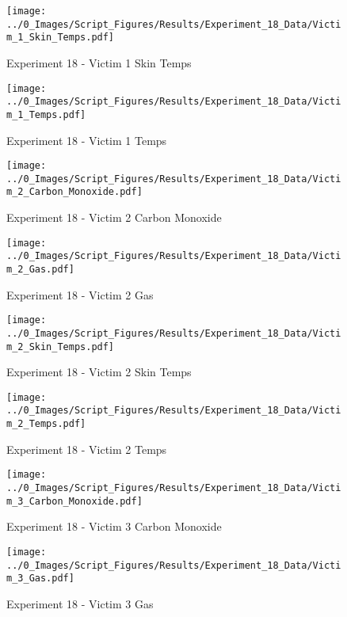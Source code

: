 	\begin{figure}[H]
		\centering
		\texttt{[image: ../0\_Images/Script\_Figures/Results/Experiment\_18\_Data/Victim\_1\_Skin\_Temps.pdf]}
		\caption[]{Experiment 18 - Victim 1 Skin Temps}
	\end{figure}
 
	\clearpage

	\begin{figure}[H]
		\centering
		\texttt{[image: ../0\_Images/Script\_Figures/Results/Experiment\_18\_Data/Victim\_1\_Temps.pdf]}
		\caption[]{Experiment 18 - Victim 1 Temps}
	\end{figure}
 

	\begin{figure}[H]
		\centering
		\texttt{[image: ../0\_Images/Script\_Figures/Results/Experiment\_18\_Data/Victim\_2\_Carbon\_Monoxide.pdf]}
		\caption[]{Experiment 18 - Victim 2 Carbon Monoxide}
	\end{figure}
 
	\clearpage

	\begin{figure}[H]
		\centering
		\texttt{[image: ../0\_Images/Script\_Figures/Results/Experiment\_18\_Data/Victim\_2\_Gas.pdf]}
		\caption[]{Experiment 18 - Victim 2 Gas}
	\end{figure}
 

	\begin{figure}[H]
		\centering
		\texttt{[image: ../0\_Images/Script\_Figures/Results/Experiment\_18\_Data/Victim\_2\_Skin\_Temps.pdf]}
		\caption[]{Experiment 18 - Victim 2 Skin Temps}
	\end{figure}
 
	\clearpage

	\begin{figure}[H]
		\centering
		\texttt{[image: ../0\_Images/Script\_Figures/Results/Experiment\_18\_Data/Victim\_2\_Temps.pdf]}
		\caption[]{Experiment 18 - Victim 2 Temps}
	\end{figure}
 

	\begin{figure}[H]
		\centering
		\texttt{[image: ../0\_Images/Script\_Figures/Results/Experiment\_18\_Data/Victim\_3\_Carbon\_Monoxide.pdf]}
		\caption[]{Experiment 18 - Victim 3 Carbon Monoxide}
	\end{figure}
 
	\clearpage

	\begin{figure}[H]
		\centering
		\texttt{[image: ../0\_Images/Script\_Figures/Results/Experiment\_18\_Data/Victim\_3\_Gas.pdf]}
		\caption[]{Experiment 18 - Victim 3 Gas}
	\end{figure}
 

